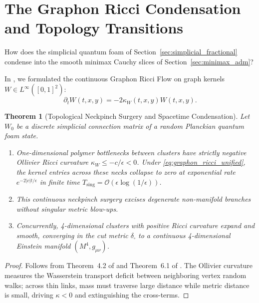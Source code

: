 \documentclass[11pt,a4paper,reqno]{amsart}
\newtheorem{theorem}{Theorem}[section]
\theoremstyle{definition}
\numberwithin{equation}{section}
\begin{document}
\section{The Graphon Ricci Condensation and Topology Transitions}
\label{sec:graphon_condensation}

How does the simplicial quantum foam of Section~\ref{sec:simplicial_fractional} condense into the smooth minimax Cauchy slices of Section~\ref{sec:minimax_adm}?

In \cite{turing2026flows}, we formulated the continuous Graphon Ricci Flow on graph kernels $W \in L^\infty([0, 1]^2)$:
\begin{equation}
    \label{eq:graphon_ricci_unified}
    \partial_t W(t, x, y) = -2 \kappa_W(t, x, y) W(t, x, y).
\end{equation}

\begin{theorem}[Topological Neckpinch Surgery and Spacetime Condensation]
\label{thm:neckpinch_condensation}
Let $W_0$ be a discrete simplicial connection matrix of a random Planckian quantum foam state.
\begin{enumerate}[label=(\roman*)]
    \item One-dimensional polymer bottlenecks between clusters have strictly negative Ollivier Ricci curvature $\kappa_W \le -c/\epsilon < 0$. Under \eqref{eq:graphon_ricci_unified}, the kernel entries across these necks collapse to zero at exponential rate $e^{-2|c|t/\epsilon}$ in finite time $T_{\mathrm{sing}} = \mathcal{O}(\epsilon \log(1/\epsilon))$.
    \item This continuous neckpinch surgery excises degenerate non-manifold branches without singular metric blow-ups.
    \item Concurrently, 4-dimensional clusters with positive Ricci curvature expand and smooth, converging in the cut metric $\delta_\square$ to a continuous 4-dimensional Einstein manifold $(M^4, g_{\mu\nu})$.
\end{enumerate}
\end{theorem}
\begin{proof}
Follows from Theorem~4.2 of \cite{turing2026flows} and Theorem~6.1 of \cite{turing2026spacetime}. The Ollivier curvature measures the Wasserstein transport deficit between neighboring vertex random walks; across thin links, mass must traverse large distance while metric distance is small, driving $\kappa < 0$ and extinguishing the cross-terms.
\end{proof}
\end{document}
